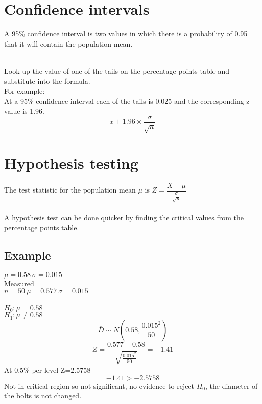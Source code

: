 \documentclass{article}[18pt]
\begin{document}
\section{Confidence intervals}
A 95\% confidence interval is two values in which there is a probability of 0.95 that it will contain the population mean.\\
\\
Look up the value of one of the tails on the percentage points table and substitute into the formula.\\
For example:\\
At a 95\% confidence interval each of the tails is 0.025 and the corresponding z value is 1.96.\\
$$\overline{x}\pm1.96\times\frac{\sigma}{\sqrt{n}}$$
\section{Hypothesis testing}
The test statistic for the population mean $\mu$ is $Z=\dfrac{X-\mu}{\frac{\sigma}{\sqrt{n}}}$\\
\\
A hypothesis test can be done quicker by finding the critical values from the percentage points table.
\subsection{Example}
$\mu=0.58 \ \sigma=0.015$\\
Measured\\
$n=50 \ \mu=0.577 \ \sigma=0.015$\\
\\
$H_0: \mu=0.58$\\
$H_1: \mu\neq0.58$\\
$$\overline{D}\sim N(0.58,\frac{0.015^2}{50})$$
$$Z=\frac{0.577-0.58}{\sqrt{\frac{0.015^2}{50}}}=-1.41$$
At 0.5\%  per level Z=2.5758
$$-1.41>-2.5758$$
Not in critical region so not significant, no evidence to reject $H_0$, the diameter of the bolts is not changed.
\newpage
\end{document}
